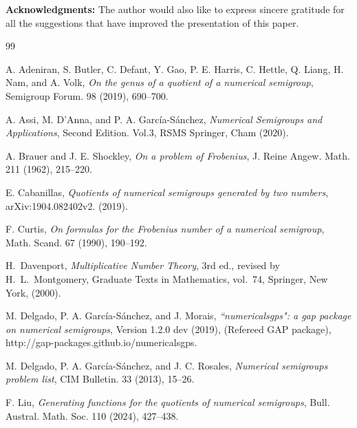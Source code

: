 \documentclass[reqno, 12pt]{article}
\numberwithin{equation}{section}
\theoremstyle{definition}
\begin{document}



\noindent
{\small \textbf{Acknowledgments:}}
The author would also like to express sincere gratitude for all the suggestions that have improved the presentation of this paper.

\begin{thebibliography}{99}

 A. Adeniran, S. Butler, C. Defant, Y. Gao, P. E. Harris, C. Hettle, Q. Liang, H. Nam, and A. Volk, \emph{On the genus of a quotient of a numerical semigroup}, Semigroup Forum. 98 (2019), 690--700.

 A. Assi, M. D'Anna, and P. A. Garc\'ia-S\'anchez,  \emph{Numerical Semigroups and Applications}, Second Edition. Vol.3, RSMS Springer, Cham (2020).

 A. Brauer and J. E. Shockley, \emph{On a problem of Frobenius}, J. Reine Angew. Math. 211 (1962), 215--220.

 E. Cabanillas, \emph{Quotients of numerical semigroups generated by two numbers}, arXiv:1904.082402v2. (2019).

 F. Curtis, \emph{On formulas for the Frobenius number of a numerical semigroup}, Math. Scand. 67 (1990), 190--192.

 H.~Davenport, \emph{Multiplicative Number Theory}, 3rd ed., revised by H.~L.~Montgomery, Graduate Texts in Mathematics, vol.~74, Springer, New York, (2000).

 M. Delgado, P. A. Garc\'ia-S\'anchez, and J. Morais, \emph{``numericalsgps": a gap package on numerical semigroups}, Version 1.2.0 dev (2019), (Refereed GAP package), http://gap-packages.github.io/numericalsgps.

 M. Delgado, P. A. Garc\'ia-S\'anchez, and J. C. Rosales, \emph{Numerical semigroups problem list}, CIM Bulletin. 33 (2013), 15--26.

 F. Liu, \emph{Generating functions for the quotients of numerical semigroups}, Bull. Austral. Math. Soc. 110 (2024), 427--438.


\end{thebibliography}
\end{document}

